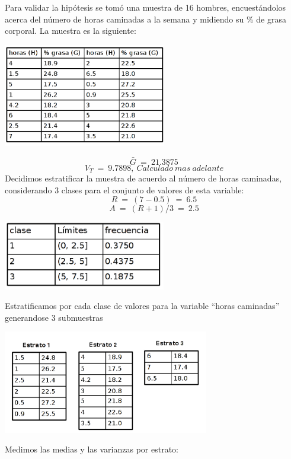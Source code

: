	Para validar la hip\'otesis se tom\'o una muestra de 16 hombres, encuest\'andolos acerca del n\'umero de horas caminadas
	a la semana y midiendo su \% de grasa corporal. La muestra es la siguiente:\\
	\begin{center}
		\includegraphics[height=4.5cm]{images/cap3_ej1_1}
	\end{center}
	$$\bar{G}\ =\ 21.3875$$
	$$V_{T}\ =\ 9.7898,\ Calculado\ mas\ adelante$$
	Decidimos estratificar la muestra de acuerdo al número de horas caminadas, considerando 3 clases para el conjunto de valores de esta variable:\\
	$$R\ =\ (7-0.5)\ =\ 6.5$$
	$$A\ =\ (R + 1)/3\ =\ 2.5$$
	\begin{center}
       		\includegraphics[height=3cm]{images/cap3_ej1_2}
       	\end{center}
	Estratificamos por cada clase de valores para la variable “horas caminadas” generandose 3 submuestras\\
	\begin{center}                                           	
       		\includegraphics[height=4.5cm]{images/cap3_ej1_3}
        \end{center}
	Medimos las medias y las varianzas por estrato:\\
